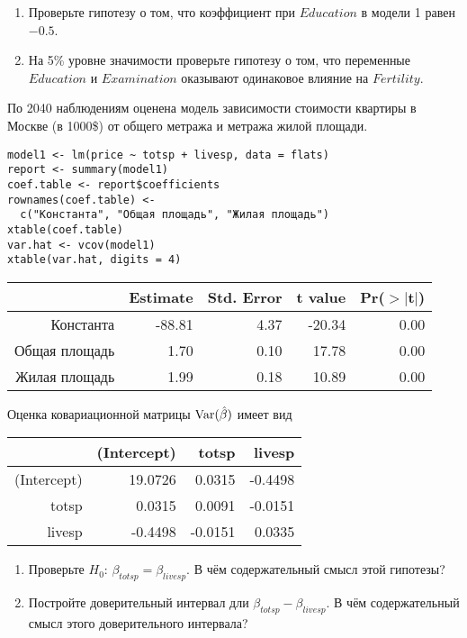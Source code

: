 \begin{problem}
\begin{enumerate}
\item Проверьте гипотезу о том, что коэффициент при $Education$ в модели 1 равен  $-0.5$.
\item На 5\% уровне значимости проверьте гипотезу о том, что
переменные $Education$ и $Examination$ оказывают одинаковое влияние на $Fertility$.
\end{enumerate}


\begin{sol}
\end{sol}
\end{problem}




\begin{problem}
По 2040 наблюдениям оценена модель зависимости стоимости квартиры в Москве (в 1000\$) от общего метража и метража жилой площади.

\begin{verbatim}
model1 <- lm(price ~ totsp + livesp, data = flats)
report <- summary(model1)
coef.table <- report$coefficients
rownames(coef.table) <-
  c("Константа", "Общая площадь", "Жилая площадь")
xtable(coef.table)
var.hat <- vcov(model1)
xtable(var.hat, digits = 4)
\end{verbatim}

\begin{tabular}{rrrrr}
  \hline
 & Estimate & Std. Error & t value & Pr($>$$|$t$|$) \\
  \hline
Константа & -88.81 & 4.37 & -20.34 & 0.00 \\
  Общая площадь & 1.70 & 0.10 & 17.78 & 0.00 \\
  Жилая площадь & 1.99 & 0.18 & 10.89 & 0.00 \\
   \hline
\end{tabular}


Оценка ковариационной матрицы $\operatorname{Var}(\hat{\beta})$ имеет вид
\begin{tabular}{rrrr}
  \hline
 & (Intercept) & totsp & livesp \\
  \hline
(Intercept) & 19.0726 & 0.0315 & -0.4498 \\
  totsp & 0.0315 & 0.0091 & -0.0151 \\
  livesp & -0.4498 & -0.0151 & 0.0335 \\
   \hline
\end{tabular}

\begin{enumerate}
\item Проверьте $H_0$: $\beta_{totsp}=\beta_{livesp}$. В чём содержательный смысл этой гипотезы?
\item Постройте доверительный интервал дли $\beta_{totsp}-\beta_{livesp}$. В чём содержательный смысл этого доверительного интервала?
\end{enumerate}




\end{problem}
